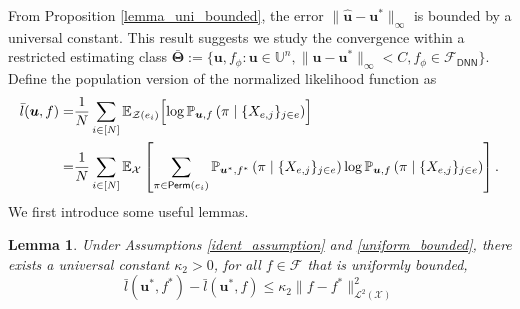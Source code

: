 \documentclass[
  12pt]{article}
\newtheorem{lemma}{Lemma}
\begin{document}
{From Proposition \ref{lemma_uni_bounded}, the error $ \|\widehat{\boldsymbol{u}}-\boldsymbol{u}^*\|_\infty$ is bounded by a universal constant. This result suggests we study the convergence within a restricted estimating class $\bar{\boldsymbol{\Theta}}:= \{ \boldsymbol{u}, f_\phi : \boldsymbol{u} \in \mathbb{U}^n, \|\boldsymbol{u}-\boldsymbol{u}^*\|_\infty<C, f_\phi \in \mathcal{F}_{\mathsf{DNN}} \}$. Define the population version of the normalized likelihood function as}
\begin{equation*}
\begin{aligned}
\bar{l}(\boldsymbol{u},f)=&\frac{1}{N}\sum_{i \in[N]}\mathbb{E}_{\mathcal{Z}(e_i)} \Bigl[\log \mathbb{P}_{\boldsymbol{u},f}\left(\pi \mid \{X_{e, j}\}_{j \in e}\right)\Bigr]\\
=&\frac{1}{N} \sum_{i \in[N]}\mathbb{E}_{\mathcal{X}} \left[ \sum_{\pi \in \mathsf{Perm}\left(e_i\right)} \mathbb{P}_{\boldsymbol{u}^*,f^*}\left(\pi \mid \{X_{e, j}\}_{j \in e}\right) \log \mathbb{P}_{\boldsymbol{u},f}\left(\pi \mid \{X_{e, j}\}_{j \in e}\right)\right].
\end{aligned}
\end{equation*}
We first introduce some useful lemmas.
\begin{lemma}\label{lemma_f_upper_quadratic}Under Assumptions \ref{ident_assumption} and \ref{uniform_bounded}, there exists a universal constant $\kappa_2>0$, for all $f \in \mathcal{F}$ that is uniformly bounded,
    $$\bar{l}(\boldsymbol{u}^*,f^*)-\bar{l}(\boldsymbol{u}^*,f)\leq \kappa_2 \| f-f^* \|^2_{\mathcal{L}^2(\mathcal{X})}$$
\end{lemma}
\end{document}
